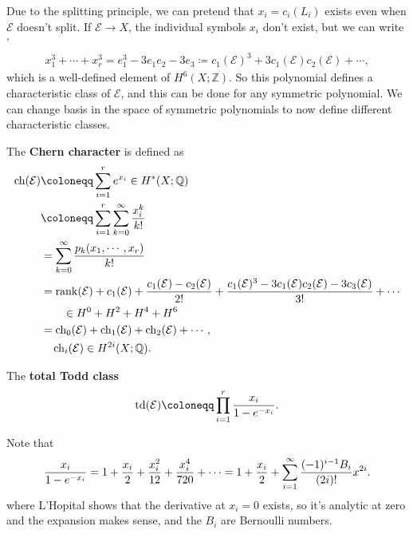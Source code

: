 \begin{remark}

Due to the splitting principle, we can pretend that \(x_i = c_i(L_i)\)
exists even when \(\mathcal{E}\) doesn't split. If
\(\mathcal{E} \to X\), the individual symbols \(x_i\) don't exist, but
we can write '
\begin{align*}
x_1^3 + \cdots + x_r^3 = e_1^3 - 3e_1 e_2 - 3e_3 \coloneqq c_1(\mathcal{E})^3 + 3c_1(\mathcal{E}) c_2(\mathcal{E}) + \cdots
,\end{align*}
which is a well-defined element of \(H^6(X; {\mathbb{Z}})\). So this
polynomial defines a characteristic class of \(\mathcal{E}\), and this
can be done for any symmetric polynomial. We can change basis in the
space of symmetric polynomials to now define different characteristic
classes.

\end{remark}

\begin{definition}

The \textbf{Chern character} is defined as
\begin{align*}
\operatorname{ch}(\mathcal{E}) 
&\coloneqq\sum_{i=1}^r e^{x_i}\in H^*(X; {\mathbb{Q}}) \\
&\coloneqq\sum_{i=1}^r \sum_{k=0}^{\infty } {x_i^k \over k!} \\
&= \sum_{k=0}^{\infty } {p_k(x_1, \cdots, x_r) \over k!} \\
&= \operatorname{rank}(\mathcal{E}) + c_1(\mathcal{E}) + { c_1(\mathcal{E}) - c_2(\mathcal{E}) \over 2!} + { c_1(\mathcal{E})^3 - 3c_1(\mathcal{E}) c_2(\mathcal{E}) - 3 c_3(\mathcal{E}) \over 3!} + \cdots \\
& \qquad \in H^0 + H^2 + H^4 + H^6 \\
&=\operatorname{ch}_0(\mathcal{E}) + \operatorname{ch}_1(\mathcal{E}) + \operatorname{ch}_2( \mathcal{E} ) + \cdots, \\
&   \quad \operatorname{ch}_i(\mathcal{E}) \in H^{2i}(X; {\mathbb{Q}}) 
.\end{align*}

\end{definition}

\begin{definition}

The \textbf{total Todd class}
\begin{align*}
\mathrm{td}(\mathcal{E})
\coloneqq
\prod_{i=1}^r { x_i \over 1 - e^{-x_i} }
.\end{align*}

Note that
\begin{align*}
{x_i \over 1 - e^{-x_i} } = 1 + {x_i \over 2} + {x_i^2 \over 12} + {x_i^4 \over 720} + \cdots = 1 + {x_i \over 2} + \sum_{i=1}^{\infty } { (-1)^{i-1} B_i \over (2i)! } x^{2i}
.\end{align*}
where L'Hopital shows that the derivative at \(x_i = 0\) exists, so it's
analytic at zero and the expansion makes sense, and the \(B_i\) are
Bernoulli numbers.

\end{definition}

